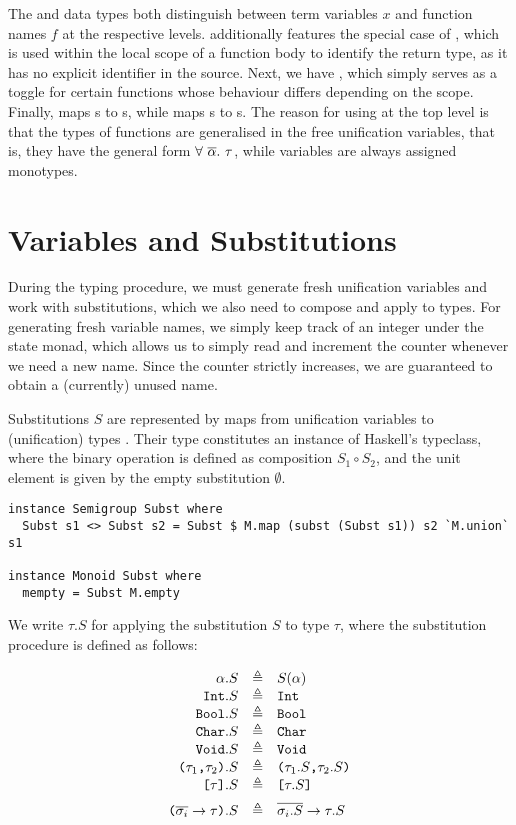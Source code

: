 The  and  data types both distinguish between
term variables $x$ and function names $f$ at the respective levels.
 additionally features the special case of ,
which is used within the local scope of a function body to identify the return
type, as it has no explicit identifier in the source.
Next, we have , which simply serves as a toggle for certain
functions whose behaviour differs depending on the scope.
Finally,  maps s to s,
while  maps s to s.
The reason for using  at the top level is that the types of
functions are generalised in the free unification variables, that is, they have
the general form $\forall\ \set{\alpha}.\ \tau$, while variables are always
assigned monotypes.


\section{Variables and Substitutions}

During the typing procedure, we must generate fresh unification variables and
work with substitutions, which we also need to compose and apply to types.
For generating fresh variable names, we simply keep track of an integer
 under the state monad, which allows us to simply read and
increment the counter whenever we need a new name. Since the counter strictly
increases, we are guaranteed to obtain a (currently) unused name.

Substitutions $S$ are represented by maps from unification variables
 to (unification) types . Their type 
constitutes an instance of Haskell's  typeclass, where the
binary operation is defined as composition $S_1 \circ S_2$, and the unit element
is given by the empty substitution $\emptyset$.

\begin{verbatim}
instance Semigroup Subst where
  Subst s1 <> Subst s2 = Subst $ M.map (subst (Subst s1)) s2 `M.union` s1

instance Monoid Subst where
  mempty = Subst M.empty
\end{verbatim}

We write $\tau.S$ for applying the substitution $S$ to type $\tau$, where the
substitution procedure is defined as follows:

\[
\begin{array}{rcl}
  \alpha.S & \eqdef & S(\alpha) \\
  \Int.S & \eqdef & \Int \\
  \Bool.S & \eqdef & \Bool \\
  \Char.S & \eqdef & \Char \\
  \Void.S & \eqdef & \Void \\
  \TProd{\tau_1}{\tau_2}.S & \eqdef & \TProd{\tau_1.S}{\tau_2.S} \\
  \TList{\tau}.S & \eqdef & \TList{\tau.S} \br
  \Parens{ \TFun{\set{\sigma_i}}{\tau} }.S & \eqdef & \TFun{\set{\sigma_i.S}}{\tau.S}
\end{array}
\]

